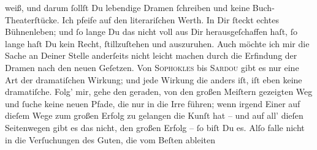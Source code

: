                weiß, und darum ſollſt Du {\pb}lebendige Dramen
               ſchreiben und keine Buch-Theaterſtücke. Ich pfeife auf den literariſchen Werth. In
               Dir ſteckt echtes Bühnenleben; und ſo lange Du das nicht voll aus Dir
               herausgeſchaffen haſt, ſo lange haſt Du kein Recht, ſtillzuſtehen und auszuruhen.
               Auch möchte ich mir die Sache an Deiner Stelle anderſeits nicht leicht machen durch
               die Erfindung der Dramen nach den neuen Geſetzen. Von \textsc{Sophokles} bis \textsc{Sardou} gibt es nur eine Art der dramatiſchen Wirkung; und jede Wirkung die anders iſt,
               iſt eben keine dramatiſche. Folg’ mir, gehe den geraden, von den großen Meiſtern
               gezeigten Weg und ſuche keine neuen Pfade, die nur in die Irre führen; wenn irgend
               Einer auf dieſem Wege zum großen Erfolg zu gelangen die Kunſt hat – und auf all’
               dieſen Seitenwegen gibt es das nicht, den großen Erfolg – ſo biſt Du es. Alſo falle
               nicht in {\pb}die Verſuchungen des Guten, die vom Beſten
                  ableiten{\dotsfive}\pend
           
